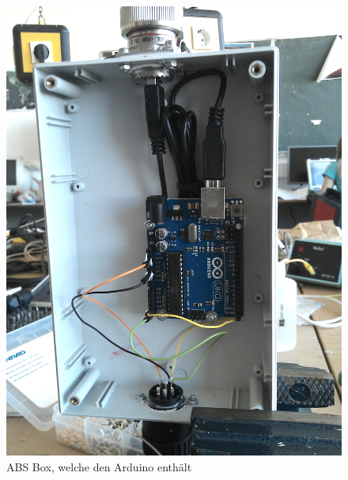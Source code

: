 \documentclass[12pt,a4paper]{scrartcl}
\begin{document}
\begin{figure}[H]
\begin{minipage}[H]{8cm}
	\centering
	\includegraphics[scale=.111]{hardwareimages/arduinobox.jpg}
	\caption{ABS Box, welche den Arduino enthält\\ }
	\label{arduinobox}
\end{minipage}
\hfill
\begin{minipage}[H]{8cm}
	\centering

\end{minipage}
\end{figure}
\end{document}
